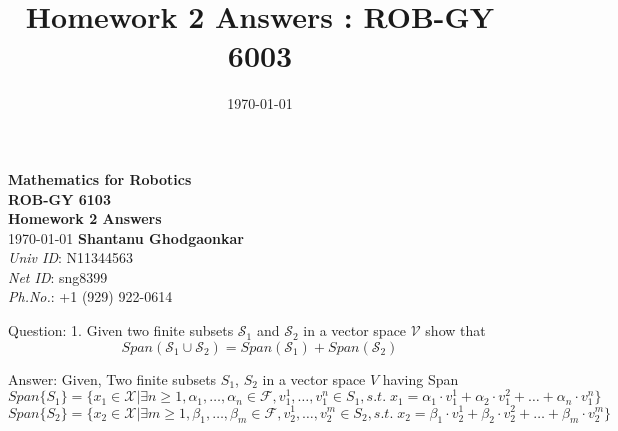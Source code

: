 \documentclass[a4paper]{article}
\title{Homework 2 Answers : ROB-GY 6003}
\author{\myName}
\date{\today}
\newcommand{\myName}{\textbf{Shantanu Ghodgaonkar}\\\textit{Univ ID}: N11344563\\\textit{Net ID}: sng8399\\\textit{Ph.No.}: +1 (929) 922-0614}
\begin{document}
	
	\begin{titlepage}
	    \centering
	    \vspace{2cm}
	    \Huge\textbf{Mathematics for Robotics \\ ROB-GY 6103 \\ Homework 2 Answers}
	    \vspace{1cm}
	    \\ \Large \today
	    \vfill
	    \Large \myName
	\end{titlepage}
	
	\begin{qalist}			
		\item[Question: 1.] \setcounter{equation}{0} %
		Given two finite subsets ${\mathcal{S}}_{1}$ and ${\mathcal{S}}_{2}$ in a vector space $\mathcal{V}$ show that \[Span({\mathcal{S}}_{1} \cup {\mathcal{S}}_{2}) = Span({\mathcal{S}}_{1}) + Span({\mathcal{S}}_{2})\]
		\item[Answer:] 
			Given, 
			Two finite subsets ${S}_{1}$, ${S}_{2}$ in a vector space $V$ having Span
			\begin{equation}
				Span\{{S}_{1}\} = \{{x}_{1} \in \mathcal{X}|\exists n \geq 1 , {\alpha}_{1}, \ldots, {\alpha}_{n} \in \mathcal{F}, {v}^{1}_{1}, \ldots, {v}^{n}_{1} \in {S}_{1}, s.t. \; {x}_{1} = {\alpha}_{1}\cdot{v}^{1}_{1} + {\alpha}_{2}\cdot{v}^{2}_{1} + \ldots + {\alpha}_{n}\cdot{v}^{n}_{1}\}
			\end{equation}
			\begin{equation}
				Span\{{S}_{2}\} = \{{x}_{2} \in \mathcal{X}|\exists m \geq 1 , {\beta}_{1}, \ldots, {\beta}_{m} \in \mathcal{F}, {v}^{1}_{2}, \ldots, {v}^{m}_{2} \in {S}_{2}, s.t. \; {x}_{2} = {\beta}_{1}\cdot{v}^{1}_{2} + {\beta}_{2}\cdot{v}^{2}_{2} + \ldots + {\beta}_{m}\cdot{v}^{m}_{2}\}
			\end{equation}
			

\end{qalist}
\end{document}
